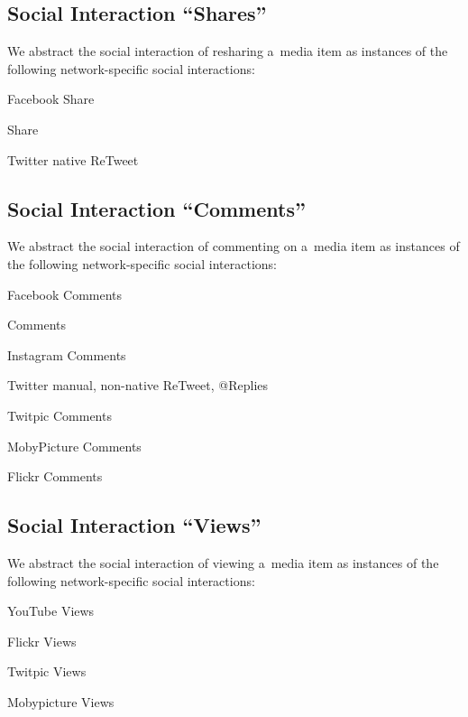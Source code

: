 \subsection{Social Interaction ``Shares''}

We abstract the social interaction of resharing a~media item
as instances of the following network-specific social interactions:

\begin{small_itemize}
  \item[] Facebook Share
  \item[] \googleplus Share
  \item[] Twitter native ReTweet
\end{small_itemize}

\subsection{Social Interaction ``Comments''}

We abstract the social interaction of commenting on a~media item
as instances of the following network-specific social interactions:

\begin{small_itemize}
  \item[] Facebook Comments
  \item[] \googleplus Comments
  \item[] Instagram Comments
  \item[] Twitter manual, non-native ReTweet, @Replies
  \item[] Twitpic Comments
  \item[] MobyPicture Comments
  \item[] Flickr Comments
\end{small_itemize}

\subsection{Social Interaction ``Views''}

We abstract the social interaction of viewing a~media item
as instances of the following network-specific social interactions:

\begin{small_itemize}
  \item[] YouTube Views
  \item[] Flickr Views
  \item[] Twitpic Views
  \item[] Mobypicture Views
\end{small_itemize}


